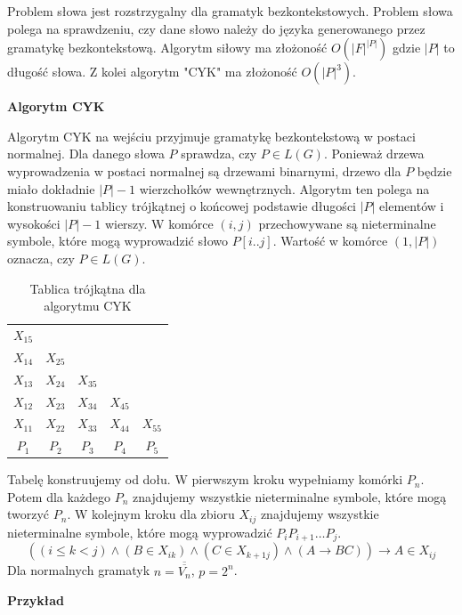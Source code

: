 \documentclass{../notatki}
\begin{document}
Problem słowa jest rozstrzygalny dla gramatyk bezkontekstowych.
Problem słowa polega na sprawdzeniu, czy dane słowo należy do języka
generowanego przez gramatykę bezkontekstową.
Algorytm siłowy ma złożoność $O(|F|^{|P|})$ gdzie $|P|$ to
długość słowa. Z kolei algorytm "CYK" ma złożoność $O(|P|^3)$.

\noindent \textbf{Algorytm CYK}

Algorytm CYK na wejściu przyjmuje gramatykę bezkontekstową w postaci
normalnej. Dla danego słowa $P$ sprawdza, czy $P \in L(G)$. Ponieważ drzewa
wyprowadzenia w postaci normalnej są drzewami binarnymi, drzewo dla $P$ będzie
miało dokładnie $|P| - 1$ wierzchołków wewnętrznych. Algorytm ten polega na
konstruowaniu tablicy trójkątnej o końcowej podstawie długości $|P|$ elementów
i wysokości $|P| - 1$ wierszy. W komórce $(i, j)$ przechowywane są nieterminalne
symbole, które mogą wyprowadzić słowo $P[i..j]$. Wartość w komórce $(1, |P|)$
oznacza, czy $P \in L(G)$.

\begin{table}[h]
  \centering
  \begin{tabular}{|ccccc}
    $X_{15}$ & & & & \\
    $X_{14}$ & $X_{25}$ & & & \\
    $X_{13}$ & $X_{24}$ & $X_{35}$ & & \\
    $X_{12}$ & $X_{23}$ & $X_{34}$ & $X_{45}$ & \\
    $X_{11}$ & $X_{22}$ & $X_{33}$ & $X_{44}$ & $X_{55}$ \\
    \hline
    $P_1$ & $P_2$ & $P_3$ & $P_4$ & $P_5$
  \end{tabular}
  \caption{Tablica trójkątna dla algorytmu CYK}
\end{table}

Tabelę konstruujemy od dołu. W pierwszym kroku wypełniamy komórki $P_n$. Potem
dla każdego $P_n$ znajdujemy wszystkie nieterminalne symbole, które mogą
tworzyć $P_n$. W kolejnym kroku dla zbioru $X_{ij}$ znajdujemy wszystkie
nieterminalne symbole, które mogą wyprowadzić $P_iP_{i+1}\dots P_j$.
$$
((i \le k < j) \land (B \in X_{ik}) \land (C \in X_{k+1j}) \land (A
\rightarrow BC)) \rightarrow A \in X_{ij}
$$
Dla normalnych gramatyk $n = \overline{\overline{V_n}}$, $p=2^n$.

\noindent \textbf{Przykład}
\end{document}
